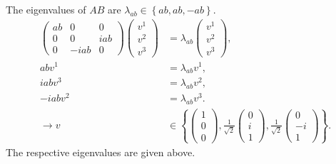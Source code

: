 \documentclass[
a4paper,
10pt,
twoside,
]{article}
\begin{document}
\subsection{} %
The eigenvalues of $AB$ are $\lambda_{ab} \in \left\{ ab,ab, -ab\right\}$.
\begin{align}
	\begin{pmatrix}
		ab & 0 & 0 \\
		0 & 0 & iab \\
		0 & -iab & 0 
	\end{pmatrix}\begin{pmatrix}
		v^1 \\ v^2 \\ v^3
	\end{pmatrix} &= \lambda_{ab}\begin{pmatrix}
		v^1 \\ v^2 \\ v^3
	\end{pmatrix},\\
	ab v^1 &= \lambda_{ab} v^1,\\
	iab v^3 &= \lambda_{ab} v^2,\\
	-iab v^2 &= \lambda_{ab} v^3.\\
	\rightarrow v&\in \left\{
		\begin{pmatrix}
			1 \\ 0 \\ 0
		\end{pmatrix},
		\frac{1}{\sqrt{2}}\begin{pmatrix}
			0 \\ i \\ 1
		\end{pmatrix},
		\frac{1}{\sqrt{2}}\begin{pmatrix}
			0 \\ -i \\ 1
		\end{pmatrix}
	\right\}.
\end{align}
The respective eigenvalues are given above.

\printbib


\stopmcols
\end{document}
